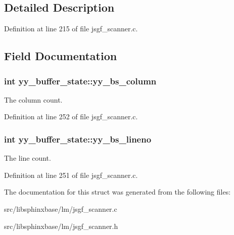 \subsection{Detailed Description}


Definition at line 215 of file jsgf\-\_\-scanner.\-c.



\subsection{Field Documentation}
\subsubsection[{yy\-\_\-bs\-\_\-column}]{\setlength{\rightskip}{0pt plus 5cm}int yy\-\_\-buffer\-\_\-state\-::yy\-\_\-bs\-\_\-column}\label{structyy__buffer__state_a10c4fcd8be759e6bf11e6d3e8cdb0307}


The column count. 



Definition at line 252 of file jsgf\-\_\-scanner.\-c.

\subsubsection[{yy\-\_\-bs\-\_\-lineno}]{\setlength{\rightskip}{0pt plus 5cm}int yy\-\_\-buffer\-\_\-state\-::yy\-\_\-bs\-\_\-lineno}\label{structyy__buffer__state_a818e94bc9c766e683c60df1e9fd01199}


The line count. 



Definition at line 251 of file jsgf\-\_\-scanner.\-c.



The documentation for this struct was generated from the following files\-:\begin{DoxyCompactItemize}
\item 
src/libsphinxbase/lm/jsgf\-\_\-scanner.\-c\item 
src/libsphinxbase/lm/jsgf\-\_\-scanner.\-h\end{DoxyCompactItemize}
